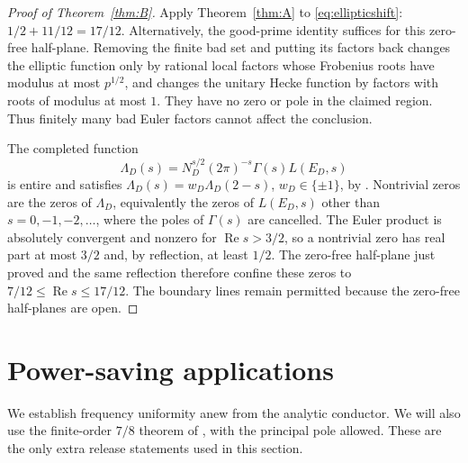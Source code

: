 \documentclass[11pt,a4paper]{article}
\numberwithin{equation}{section}
\theoremstyle{definition}
\theoremstyle{remark}
\newcommand{\Rea}{\operatorname{Re}}
\begin{document}
\begin{proof}[Proof of Theorem~\ref{thm:B}]
Apply Theorem~\ref{thm:A} to \eqref{eq:ellipticshift}: $1/2+11/12=17/12$. Alternatively, the good-prime identity suffices for this zero-free half-plane. Removing the finite bad set and putting its factors back changes the elliptic function only by rational local factors whose Frobenius roots have modulus at most $p^{1/2}$, and changes the unitary Hecke function by factors with roots of modulus at most $1$. They have no zero or pole in the claimed region. Thus finitely many bad Euler factors cannot affect the conclusion.

The completed function
\[
 \Lambda_D(s)=N_D^{s/2}(2\pi)^{-s}\Gamma(s)L(E_D,s)
\]
is entire and satisfies $\Lambda_D(s)=w_D\Lambda_D(2-s)$, $w_D\in\{\pm1\}$, by \cite[Chapter II, Corollary 10.5.1]{Silverman}. Nontrivial zeros are the zeros of $\Lambda_D$, equivalently the zeros of $L(E_D,s)$ other than $s=0,-1,-2,\ldots$, where the poles of $\Gamma(s)$ are cancelled. The Euler product is absolutely convergent and nonzero for $\Rea s>3/2$, so a nontrivial zero has real part at most $3/2$ and, by reflection, at least $1/2$. The zero-free half-plane just proved and the same reflection therefore confine these zeros to $7/12\le\Rea s\le17/12$. The boundary lines remain permitted because the zero-free half-planes are open.
\end{proof}

\section{Power-saving applications}\label{sec:applications}
We establish frequency uniformity anew from the analytic conductor. We will also use the finite-order $7/8$ theorem of \cite[Theorem 1.1]{QRH78}, with the principal pole allowed. These are the only extra release statements used in this section.
\end{document}
